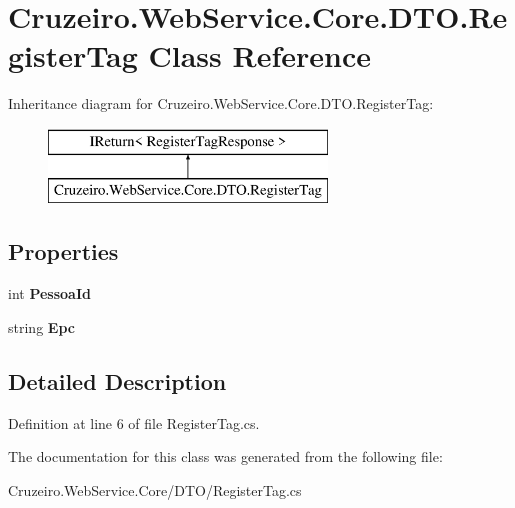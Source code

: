 \hypertarget{class_cruzeiro_1_1_web_service_1_1_core_1_1_d_t_o_1_1_register_tag}{}\section{Cruzeiro.\+Web\+Service.\+Core.\+D\+T\+O.\+Register\+Tag Class Reference}
\label{class_cruzeiro_1_1_web_service_1_1_core_1_1_d_t_o_1_1_register_tag}
Inheritance diagram for Cruzeiro.\+Web\+Service.\+Core.\+D\+T\+O.\+Register\+Tag\+:\begin{figure}[H]
\begin{center}
\leavevmode
\includegraphics[height=2.000000cm]{class_cruzeiro_1_1_web_service_1_1_core_1_1_d_t_o_1_1_register_tag}
\end{center}
\end{figure}
\subsection*{Properties}
\begin{DoxyCompactItemize}
\item 
int {\bfseries Pessoa\+Id}\hypertarget{class_cruzeiro_1_1_web_service_1_1_core_1_1_d_t_o_1_1_register_tag_ad1c34c21fd5c3689f4cf56f052076973}{}\label{class_cruzeiro_1_1_web_service_1_1_core_1_1_d_t_o_1_1_register_tag_ad1c34c21fd5c3689f4cf56f052076973}

\item 
string {\bfseries Epc}\hypertarget{class_cruzeiro_1_1_web_service_1_1_core_1_1_d_t_o_1_1_register_tag_a9d92477b2ef8e4534d470729731a578c}{}\label{class_cruzeiro_1_1_web_service_1_1_core_1_1_d_t_o_1_1_register_tag_a9d92477b2ef8e4534d470729731a578c}

\end{DoxyCompactItemize}


\subsection{Detailed Description}


Definition at line 6 of file Register\+Tag.\+cs.



The documentation for this class was generated from the following file\+:\begin{DoxyCompactItemize}
\item 
Cruzeiro.\+Web\+Service.\+Core/\+D\+T\+O/Register\+Tag.\+cs\end{DoxyCompactItemize}
